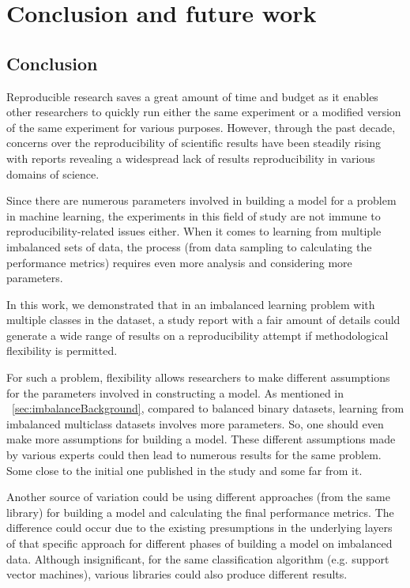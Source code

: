 \chapter{Conclusion and future work}
\section{Conclusion}

Reproducible research saves a great amount of time and budget as it enables other researchers 
to quickly run either the same experiment or a modified version of the same experiment for 
various purposes. However, through the past decade, concerns over the reproducibility of 
scientific results have been steadily rising with reports revealing a widespread lack of 
results reproducibility in various domains of science. 

Since there are numerous parameters involved in building a model for a problem in machine learning, 
the experiments in this field of study are not immune to reproducibility-related issues either. When it 
comes to learning from multiple imbalanced sets of data, the process (from data sampling  
to calculating the performance metrics) requires even more analysis and considering more parameters. 

In this work, we demonstrated that in an imbalanced learning problem with multiple classes 
in the dataset, a study report with a fair amount of details could generate a wide range of 
results on a reproducibility attempt if methodological flexibility is permitted. 

For such a problem, flexibility allows researchers to make different assumptions for the 
parameters involved in constructing a model.  As mentioned in ~\ref{sec:imbalanceBackground}, 
compared to balanced binary datasets, learning from imbalanced multiclass datasets involves 
more parameters. So, one should even make more assumptions for building a model. These 
different assumptions made by various experts could then lead to numerous results for 
the same problem.  Some close to the initial one published in the study and some far from it.

Another source of variation could be using different approaches (from the same library) for 
building a model and calculating the final performance metrics. The difference could occur due 
to the existing presumptions in the underlying layers of that specific approach for different 
phases of building a model on imbalanced data. Although insignificant, for the same classification 
algorithm (e.g. support vector machines), various libraries could also produce different results. 

